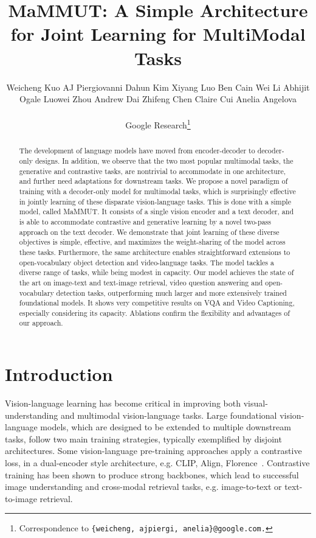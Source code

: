 \documentclass[10pt]{article} \usepackage[accepted]{tmlr}
\title{MaMMUT: A Simple Architecture for Joint Learning for MultiModal Tasks}
\author{
\parbox{\linewidth}{{\centering
Weicheng Kuo\footnotemark[1]\hspace{.4cm}
AJ Piergiovanni\footnotemark[1]\hspace{.4cm}
Dahun Kim\footnotemark[2]\hspace{.4cm}
Xiyang Luo\footnotemark[2]\hspace{.4cm}
Ben Cain\hspace{.4cm}
Wei Li\hspace{.4cm}
Abhijit Ogale\hspace{.4cm}
Luowei Zhou\hspace{.4cm}
Andrew Dai\hspace{.4cm}
Zhifeng Chen\hspace{.4cm}
Claire Cui\hspace{.4cm}
Anelia Angelova
\\
}
}
\parbox{\linewidth}{\centering \vspace{0.2cm}
Google Research\thanks{Correspondence to \texttt{\small{\{weicheng, ajpiergi, anelia\}}@google.com.}}
}
\vspace{0.5cm}
}
\begin{document}
\maketitle



\vspace{-0.5cm}
\begin{abstract}
\vspace{-0.2cm}

 The development of language models have moved from encoder-decoder to decoder-only designs. In addition, we observe that the two most popular multimodal tasks, the generative and contrastive tasks, are nontrivial to accommodate in one architecture, and further need adaptations for downstream tasks. We propose a novel paradigm of training with a decoder-only model for multimodal tasks, which is surprisingly effective in jointly learning of these disparate vision-language tasks. This is done with a simple model, called MaMMUT. It consists of a single vision encoder and a text decoder, and is able to accommodate contrastive and generative learning by a novel two-pass approach on the text decoder. We demonstrate that joint learning of these diverse objectives is simple, effective, and maximizes the weight-sharing of the model across these tasks. Furthermore, the same architecture enables straightforward extensions to open-vocabulary object detection and video-language tasks. The model tackles a diverse range of tasks, while being modest in capacity. Our model achieves the state of the art on image-text and text-image retrieval, video question answering and open-vocabulary detection tasks, outperforming much larger and more extensively trained foundational models. It shows very competitive results on VQA and Video Captioning, especially considering its capacity. Ablations confirm the flexibility and advantages of our approach.


\end{abstract}


\vspace{-5mm}
\section{Introduction}
\vspace{-2mm}


 

Vision-language learning has become critical in improving both  visual-understanding and multimodal vision-language tasks.
Large foundational vision-language models,  which are designed to be extended to multiple downstream tasks, follow two main training strategies, typically exemplified by disjoint architectures. Some vision-language pre-training approaches apply a contrastive loss, in a dual-encoder style architecture, e.g. CLIP, Align, Florence~\citep{radford2021clip,align,yuan2021florence}. 
Contrastive training has been shown to produce strong backbones, which lead to successful image understanding and cross-modal retrieval tasks, e.g. image-to-text or text-to-image retrieval. 
\end{document}
